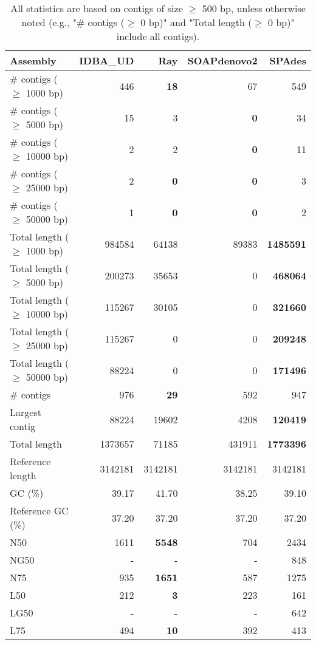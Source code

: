 \documentclass[12pt,a4paper]{article}
\begin{document}
\begin{table}[ht]
\begin{center}
\caption{All statistics are based on contigs of size $\geq$ 500 bp, unless otherwise noted (e.g., "\# contigs ($\geq$ 0 bp)" and "Total length ($\geq$ 0 bp)" include all contigs).}
\begin{tabular}{|l*{4}{|r}|}
\hline
Assembly & IDBA\_UD & Ray & SOAPdenovo2 & SPAdes \\ \hline
\# contigs ($\geq$ 1000 bp) & 446 & {\bf 18} & 67 & 549 \\ \hline
\# contigs ($\geq$ 5000 bp) & 15 & 3 & {\bf 0} & 34 \\ \hline
\# contigs ($\geq$ 10000 bp) & 2 & 2 & {\bf 0} & 11 \\ \hline
\# contigs ($\geq$ 25000 bp) & 2 & {\bf 0} & {\bf 0} & 3 \\ \hline
\# contigs ($\geq$ 50000 bp) & 1 & {\bf 0} & {\bf 0} & 2 \\ \hline
Total length ($\geq$ 1000 bp) & 984584 & 64138 & 89383 & {\bf 1485591} \\ \hline
Total length ($\geq$ 5000 bp) & 200273 & 35653 & 0 & {\bf 468064} \\ \hline
Total length ($\geq$ 10000 bp) & 115267 & 30105 & 0 & {\bf 321660} \\ \hline
Total length ($\geq$ 25000 bp) & 115267 & 0 & 0 & {\bf 209248} \\ \hline
Total length ($\geq$ 50000 bp) & 88224 & 0 & 0 & {\bf 171496} \\ \hline
\# contigs & 976 & {\bf 29} & 592 & 947 \\ \hline
Largest contig & 88224 & 19602 & 4208 & {\bf 120419} \\ \hline
Total length & 1373657 & 71185 & 431911 & {\bf 1773396} \\ \hline
Reference length & 3142181 & 3142181 & 3142181 & 3142181 \\ \hline
GC (\%) & 39.17 & 41.70 & 38.25 & 39.10 \\ \hline
Reference GC (\%) & 37.20 & 37.20 & 37.20 & 37.20 \\ \hline
N50 & 1611 & {\bf 5548} & 704 & 2434 \\ \hline
NG50 & - & - & - & 848 \\ \hline
N75 & 935 & {\bf 1651} & 587 & 1275 \\ \hline
L50 & 212 & {\bf 3} & 223 & 161 \\ \hline
LG50 & - & - & - & 642 \\ \hline
L75 & 494 & {\bf 10} & 392 & 413 \\ \hline

\end{tabular}
\end{center}
\end{table}
\end{document}
